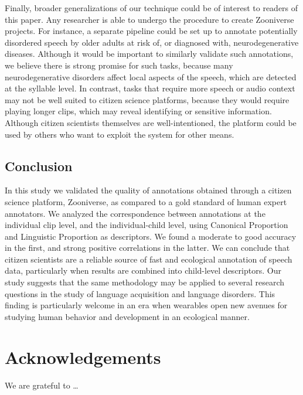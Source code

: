 \documentclass[english,,man,floatsintext]{apa6}
\begin{document}
Finally, broader generalizations of our technique could be of interest to readers of this paper. Any researcher is able to undergo the procedure to create Zooniverse projects. For instance, a separate pipeline could be set up to annotate potentially disordered speech by older adults at risk of, or diagnosed with, neurodegenerative diseases. Although it would be important to similarly validate such annotations, we believe there is strong promise for such tasks, because many neurodegenerative disorders affect local aspects of the speech, which are detected at the syllable level. In contrast, tasks that require more speech or audio context may not be well suited to citizen science platforms, because they would require playing longer clips, which may reveal identifying or sensitive information. Although citizen scientists themselves are well-intentioned, the platform could be used by others who want to exploit the system for other means.

\hypertarget{conclusion}{%
\subsection{Conclusion}\label{conclusion}}

In this study we validated the quality of annotations obtained through a citizen science platform, Zooniverse, as compared to a gold standard of human expert annotators. We analyzed the correspondence between annotations at the individual clip level, and the individual-child level, using Canonical Proportion and Linguistic Proportion as descriptors. We found a moderate to good accuracy in the first, and strong positive correlations in the latter. We can conclude that citizen scientists are a reliable source of fast and ecological annotation of speech data, particularly when results are combined into child-level descriptors. Our study suggests that the same methodology may be applied to several research questions in the study of language acquisition and language disorders. This finding is particularly welcome in an era when wearables open new avenues for studying human behavior and development in an ecological manner.

\newpage

\hypertarget{acknowledgements}{%
\section{Acknowledgements}\label{acknowledgements}}

We are grateful to \ldots{}
\end{document}

